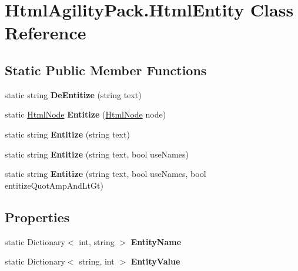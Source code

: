 \hypertarget{class_html_agility_pack_1_1_html_entity}{}\section{Html\+Agility\+Pack.\+Html\+Entity Class Reference}
\label{class_html_agility_pack_1_1_html_entity}
\subsection*{Static Public Member Functions}
\begin{DoxyCompactItemize}
\item 
\mbox{\label{class_html_agility_pack_1_1_html_entity_a0eff30150e69a7c8097125ee108a0a49}} 
static string {\bfseries De\+Entitize} (string text)
\item 
\mbox{\label{class_html_agility_pack_1_1_html_entity_ae752bfdce1a048ebfe9bc9a515a7c637}} 
static \hyperlink{class_html_agility_pack_1_1_html_node}{Html\+Node} {\bfseries Entitize} (\hyperlink{class_html_agility_pack_1_1_html_node}{Html\+Node} node)
\item 
\mbox{\label{class_html_agility_pack_1_1_html_entity_ada97762ae6193f45090e133b08d7def4}} 
static string {\bfseries Entitize} (string text)
\item 
\mbox{\label{class_html_agility_pack_1_1_html_entity_a82d69919761ce06894ea5891a043ee99}} 
static string {\bfseries Entitize} (string text, bool use\+Names)
\item 
\mbox{\label{class_html_agility_pack_1_1_html_entity_a9f2705a754944fb7454590094c38efb1}} 
static string {\bfseries Entitize} (string text, bool use\+Names, bool entitize\+Quot\+Amp\+And\+Lt\+Gt)
\end{DoxyCompactItemize}
\subsection*{Properties}
\begin{DoxyCompactItemize}
\item 
\mbox{\label{class_html_agility_pack_1_1_html_entity_a3b277cbbff3e632112d644da68b1d0a0}} 
static Dictionary$<$ int, string $>$ {\bfseries Entity\+Name}
\item 
\mbox{\label{class_html_agility_pack_1_1_html_entity_af2b170765d77b4c01818806bda5acbf8}} 
static Dictionary$<$ string, int $>$ {\bfseries Entity\+Value}
\end{DoxyCompactItemize}


